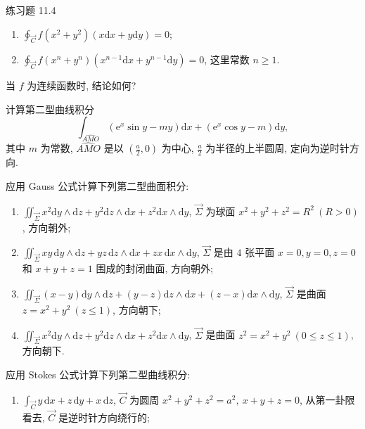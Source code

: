 \begin{exblock}{练习题 11.4}
\begin{enumerate}[label=(\arabic*),leftmargin=2.6em,itemsep=0.15\baselineskip,topsep=0.2\baselineskip]
  \item $\displaystyle\oint_{\overrightarrow{C}}f(x^{2}+y^{2})(x\mathrm{d}x+y\mathrm{d}y)=0$;
  \item $\displaystyle\oint_{\overrightarrow{C}}f(x^{n}+y^{n})(x^{n-1}\mathrm{d}x+y^{n-1}\mathrm{d}y)=0$, 这里常数 $n\geqslant1$.
  \end{enumerate}
  当 $f$ 为连续函数时, 结论如何?
\item 计算第二型曲线积分
  \[
  \int_{\widehat{AMO}}\left(\mathrm{e}^{x}\sin y-my\right)\mathrm{d}x+\left(\mathrm{e}^{x}\cos y-m\right)\mathrm{d}y,
  \]
  其中 $m$ 为常数, $\widehat{AMO}$ 是以 $\left(\frac{a}{2},0\right)$ 为中心, $\frac{a}{2}$ 为半径的上半圆周, 定向为逆时针方向.
\item 应用 Gauss 公式计算下列第二型曲面积分:
  \begin{enumerate}[label=(\arabic*),leftmargin=2.6em,itemsep=0.15\baselineskip,topsep=0.2\baselineskip]
  \item $\displaystyle\iint_{\overrightarrow{\Sigma}}x^{2}\mathrm{d}y\wedge\mathrm{d}z+y^{2}\mathrm{d}z\wedge\mathrm{d}x+z^{2}\mathrm{d}x\wedge\mathrm{d}y$, $\overrightarrow{\Sigma}$ 为球面 $x^{2}+y^{2}+z^{2}=R^{2}\ (R>0)$, 方向朝外;
  \item $\displaystyle\iint_{\overrightarrow{\Sigma}}xy\,\mathrm{d}y\wedge\mathrm{d}z+yz\,\mathrm{d}z\wedge\mathrm{d}x+zx\,\mathrm{d}x\wedge\mathrm{d}y$, $\overrightarrow{\Sigma}$ 是由 $4$ 张平面 $x=0,y=0,z=0$ 和 $x+y+z=1$ 围成的封闭曲面, 方向朝外;
  \item $\displaystyle\iint_{\overrightarrow{\Sigma}}(x-y)\mathrm{d}y\wedge\mathrm{d}z+(y-z)\mathrm{d}z\wedge\mathrm{d}x+(z-x)\mathrm{d}x\wedge\mathrm{d}y$, $\overrightarrow{\Sigma}$ 是曲面 $z=x^{2}+y^{2}\ (z\leqslant1)$, 方向朝下;
  \item $\displaystyle\iint_{\overrightarrow{\Sigma}}x^{2}\mathrm{d}y\wedge\mathrm{d}z+y^{2}\mathrm{d}z\wedge\mathrm{d}x+z^{2}\mathrm{d}x\wedge\mathrm{d}y$, $\overrightarrow{\Sigma}$ 是曲面 $z^{2}=x^{2}+y^{2}\ (0\leqslant z\leqslant1)$, 方向朝下.
  \end{enumerate}
\item 应用 Stokes 公式计算下列第二型曲线积分:
  \begin{enumerate}[label=(\arabic*),leftmargin=2.6em,itemsep=0.15\baselineskip,topsep=0.2\baselineskip]
  \item $\displaystyle\int_{\overrightarrow{C}}y\,\mathrm{d}x+z\,\mathrm{d}y+x\,\mathrm{d}z$, $\overrightarrow{C}$ 为圆周 $x^{2}+y^{2}+z^{2}=a^{2},\ x+y+z=0$, 从第一卦限看去, $\overrightarrow{C}$ 是逆时针方向绕行的;

\end{enumerate}
\end{exblock}

